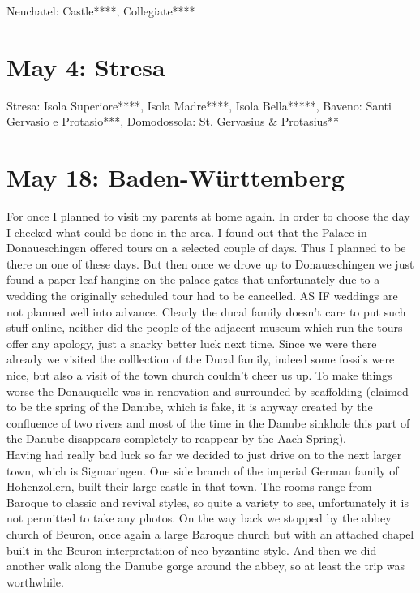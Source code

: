 Neuchatel: Castle****, Collegiate****

\section{May 4: Stresa}
\label{Stresa2014}

Stresa: Isola Superiore****, Isola Madre****, Isola Bella*****, Baveno: Santi Gervasio e Protasio***, Domodossola:  St. Gervasius \& Protasius**

\section{May 18: Baden-W\"urttemberg}
\label{Donaueschingen2014}

For once I planned to visit my parents at home again. In order to choose the day I checked what could be done in the area. I found out that the Palace in Donaueschingen offered tours on a selected couple of days. Thus I planned to be there on one of these days. But then once we drove up to Donaueschingen we just found a paper leaf hanging on the palace gates that unfortunately due to a wedding the originally scheduled tour had to be cancelled. AS IF weddings are not planned well into advance. Clearly the ducal family doesn't care to put such stuff online, neither did the people of the adjacent museum which run the tours offer any apology, just a snarky better luck next time. Since we were there already we visited the colllection of the Ducal family, indeed some fossils were nice, but also a visit of the town church couldn't cheer us up. To make things worse the Donauquelle was in renovation and surrounded by scaffolding (claimed to be the spring of the Danube, which is fake, it is anyway created by the confluence of two rivers and most of the time in the Danube sinkhole this part of the Danube disappears completely to reappear by the Aach Spring). \\
Having had really bad luck so far we decided to just drive on to the next larger town, which is Sigmaringen. One side branch of the imperial German family of Hohenzollern, built their large castle in that town. The rooms range from Baroque to classic and revival styles, so quite a variety to see, unfortunately it is not permitted to take any photos. On the way back we stopped by the abbey church of Beuron, once again a large Baroque church but with an attached chapel built in the Beuron interpretation of neo-byzantine style. And then we did another walk along the Danube gorge around the abbey, so at least the trip was worthwhile.\\

